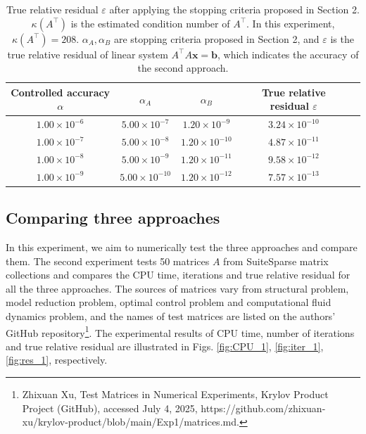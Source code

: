 \begin{table}[htbp]
    \centering
    \begin{tabular}{c c c c c}
        \toprule
        Controlled accuracy $\alpha$  & $\alpha_A$ & $\alpha_B$ & True relative residual $\varepsilon$\\
        \midrule
        $ 1.00 \times 10^{-6}$ & $5.00 \times 10^{-7}$ & $1.20 \times 10^{-9}$ &  $3.24 \times 10^{-10}$\\
        $ 1.00 \times 10^{-7}$ & $5.00 \times 10^{-8}$ & $1.20 \times 10^{-10}$ &  $4.87 \times 10^{-11}$\\
        $ 1.00 \times 10^{-8}$ & $5.00 \times 10^{-9}$ & $1.20 \times 10^{-11}$ &  $9.58 \times 10^{-12}$\\
        $ 1.00 \times 10^{-9}$ & $5.00 \times 10^{-10}$ & $1.20 \times 10^{-12}$ &  $7.57 \times 10^{-13}$\\
        \bottomrule
    \end{tabular}
    \caption{True relative residual  $ \varepsilon $ after applying the stopping criteria proposed in Section 2. $\kappa(A^\top)$ is the estimated condition number of $A^\top$. In this experiment, $\kappa(A^\top)=208$. $\alpha_A, \alpha_B$ are stopping criteria proposed in Section 2, and $\varepsilon$ is the true relative residual of linear system $A^\top A\boldsymbol{x}=\boldsymbol{b}$, which indicates the accuracy of the second approach.}
    \label{tab:res}
\end{table}
\subsection{Comparing three approaches}
\par
In this experiment, we aim to numerically test the three approaches and compare them. The second experiment tests 50 matrices $A$ from SuiteSparse matrix collections \cite{TI11} and compares the CPU time, iterations and true relative residual for all the three approaches. The sources of matrices vary from structural problem, model reduction problem, optimal control problem and computational fluid dynamics problem, and the names of test matrices are listed on the authors' GitHub repository\footnote{Zhixuan Xu, Test Matrices in Numerical Experiments, Krylov Product Project (GitHub), accessed July 4, 2025, https://github.com/zhixuan-xu/krylov-product/blob/main/Exp1/matrices.md.}.
The experimental results of CPU time, number of iterations and true relative residual are illustrated in Figs. \ref{fig:CPU_1}, \ref{fig:iter_1}, \ref{fig:res_1}, respectively.


